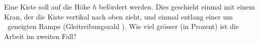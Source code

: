 Eine Kiste soll auf die Höhe $h$ befördert werden. Dies geschieht einmal mit einem Kran, der die Kiste vertikal nach oben zieht, und einmal entlang einer um \alrO\ geneigten Rampe (Gleitreibungszahl \murO). Wie viel grösser (in Prozent) ist die Arbeit im zweiten Fall?
